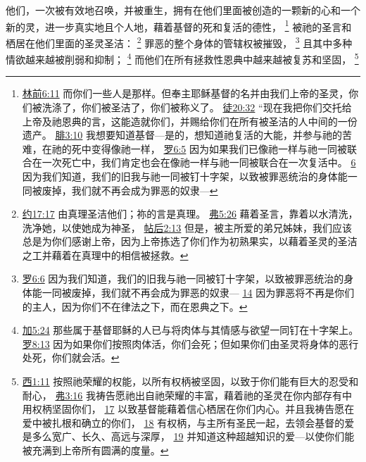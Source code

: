 \documentclass[12pt, a4paper, oneside]{ctexart}
\newcounter{parnum}[section]
\newcommand{\N}{%
   \noindent\refstepcounter{parnum}%
    \makebox[\parindent][l]{\textbf{\arabic{parnum}.}}}
\begin{document}
\N 他们，一次被有效地召唤，并被重生，拥有在他们里面被创造的一颗新的心和一个新的灵，进一步真实地且个人地，藉着基督的死和复活的德性，
	\footnote {
		\href{https://biblehub.com/1_corinthians/6-11.htm}{林前6:11} 而你们一些人是那样。但奉主耶稣基督的名并由我们上帝的圣灵，你们被洗涤了，你们被圣洁了，你们被称义了。
		\href{https://biblehub.com/acts/20-32.htm}{徒20:32} “现在我把你们交托给上帝及祂恩典的言，这能造就你们，并赐给你们在所有被圣洁的人中间的一份遗产。
		\href{https://biblehub.com/philippians/3-10.htm}{腓3:10} 我想要知道基督---是的，想知道祂复活的大能，并参与祂的苦难，在祂的死中变得像祂一样，
		\href{https://biblehub.com/romans/6-5.htm}{罗6:5} 因为如果我们已像祂一样与祂一同被联合在一次死亡中，我们肯定也会在像祂一样与祂一同被联合在一次复活中。
		\href{https://biblehub.com/romans/6-6.htm}{6} 因为我们知道，我们的旧我与祂一同被钉十字架，以致被罪恶统治的身体能一同被废掉，我们就不再会成为罪恶的奴隶---
	}
	被祂的圣言和栖居在他们里面的圣灵圣洁：
	\footnote {
		\href{https://biblehub.com/john/17-17.htm}{约17:17} 由真理圣洁他们；祢的言是真理。
		\href{https://biblehub.com/ephesians/5-26.htm}{弗5:26} 藉着圣言，靠着以水清洗，洗净她，以使她成为神圣，
		\href{https://biblehub.com/2_thessalonians/2-13.htm}{帖后2:13} 但是，被主所爱的弟兄姊妹，我们应该总是为你们感谢上帝，因为上帝拣选了你们作为初熟果实，以藉着圣灵的圣洁之工并藉着在真理中的相信被拯救。
	}
	罪恶的整个身体的管辖权被摧毁，
	\footnote {
		\href{https://biblehub.com/romans/6-6.htm}{罗6:6} 因为我们知道，我们的旧我与祂一同被钉十字架，以致被罪恶统治的身体能一同被废掉，我们就不再会成为罪恶的奴隶---
		\href{https://biblehub.com/romans/6-14.htm}{14} 因为罪恶将不再是你们的主人，因为你们不在律法之下，而在恩典之下。
	}
	且其中多种情欲越来越被削弱和抑制；
	\footnote {
		\href{https://biblehub.com/galatians/5-24.htm}{加5:24} 那些属于基督耶稣的人已与将肉体与其情感与欲望一同钉在十字架上。
		\href{https://biblehub.com/romans/8-13.htm}{罗8:13} 因为如果你们按照肉体活，你们会死；但如果你们由圣灵将身体的恶行处死，你们就会活。
	}
	而他们在所有拯救性恩典中越来越被复苏和坚固，
	\footnote {
		\href{https://biblehub.com/colossians/1-11.htm}{西1:11} 按照祂荣耀的权能，以所有权柄被坚固，以致于你们能有巨大的忍受和耐心，
		\href{https://biblehub.com/ephesians/3-16.htm}{弗3:16} 我祷告愿祂出自祂荣耀的丰富，藉着祂的圣灵在你内部存有中用权柄坚固你们，
		\href{https://biblehub.com/ephesians/3-17.htm}{17} 以致基督能藉着信心栖居在你们内心。并且我祷告愿在爱中被扎根和确立的你们，
		\href{https://biblehub.com/ephesians/3-18.htm}{18} 有权柄，与主所有圣民一起，去领会基督的爱是多么宽广、长久、高远与深厚，
		\href{https://biblehub.com/ephesians/3-19.htm}{19} 并知道这种超越知识的爱---以使你们能被充满到上帝所有圆满的度量。
	}
\end{document}
